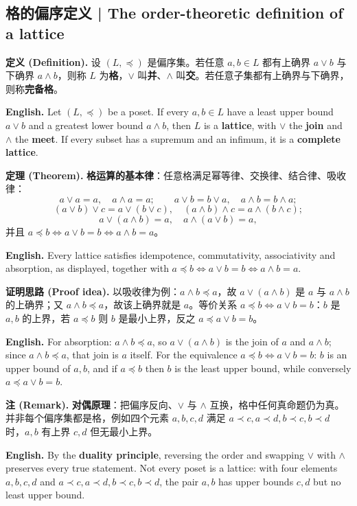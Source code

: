 \documentclass[UTF8,11pt,a4paper]{ctexart}
\newcommand{\EN}[1]{\par\noindent \textbf{English.} #1\par}
\newcommand{\DEF}[2]{\par\noindent\textbf{定义 (Definition).} #1\par\EN{#2}}
\newcommand{\THM}[2]{\par\noindent\textbf{定理 (Theorem).} #1\par\EN{#2}}
\newcommand{\PRF}[2]{\par\noindent\textbf{证明思路 (Proof idea).} #1\par\EN{#2}}
\newcommand{\REM}[2]{\par\noindent\textbf{注 (Remark).} #1\par\EN{#2}}
\begin{document}
\subsection{格的偏序定义 | The order-theoretic definition of a lattice}
\DEF{设 $(L,\preccurlyeq)$ 是偏序集。若任意 $a,b\in L$ 都有上确界 $a\vee b$ 与下确界 $a\wedge b$，则称 $L$ 为\textbf{格}，$\vee$ 叫\textbf{并}、$\wedge$ 叫\textbf{交}。若任意子集都有上确界与下确界，则称\textbf{完备格}。}{Let $(L,\preccurlyeq)$ be a poset. If every $a,b\in L$ have a least upper bound $a\vee b$ and a greatest lower bound $a\wedge b$, then $L$ is a \textbf{lattice}, with $\vee$ the \textbf{join} and $\wedge$ the \textbf{meet}. If every subset has a supremum and an infimum, it is a \textbf{complete lattice}.}
\THM{\textbf{格运算的基本律}：任意格满足幂等律、交换律、结合律、吸收律：
\[
a\vee a=a,\quad a\wedge a=a;\qquad a\vee b=b\vee a,\quad a\wedge b=b\wedge a;
\]
\[
(a\vee b)\vee c=a\vee(b\vee c),\quad (a\wedge b)\wedge c=a\wedge(b\wedge c);
\]
\[
a\vee(a\wedge b)=a,\quad a\wedge(a\vee b)=a,
\]
并且 $a\preccurlyeq b\Leftrightarrow a\vee b=b\Leftrightarrow a\wedge b=a$。}{Every lattice satisfies idempotence, commutativity, associativity and absorption, as displayed, together with $a\preccurlyeq b\Leftrightarrow a\vee b=b\Leftrightarrow a\wedge b=a$.}
\PRF{以吸收律为例：$a\wedge b\preccurlyeq a$，故 $a\vee(a\wedge b)$ 是 $a$ 与 $a\wedge b$ 的上确界；又 $a\wedge b\preccurlyeq a$，故该上确界就是 $a$。等价关系 $a\preccurlyeq b\Leftrightarrow a\vee b=b$：$b$ 是 $a,b$ 的上界，若 $a\preccurlyeq b$ 则 $b$ 是最小上界，反之 $a\preccurlyeq a\vee b=b$。}{For absorption: $a\wedge b\preccurlyeq a$, so $a\vee(a\wedge b)$ is the join of $a$ and $a\wedge b$; since $a\wedge b\preccurlyeq a$, that join is $a$ itself. For the equivalence $a\preccurlyeq b\Leftrightarrow a\vee b=b$: $b$ is an upper bound of $a,b$, and if $a\preccurlyeq b$ then $b$ is the least upper bound, while conversely $a\preccurlyeq a\vee b=b$.}
\REM{\textbf{对偶原理}：把偏序反向、$\vee$ 与 $\wedge$ 互换，格中任何真命题仍为真。并非每个偏序集都是格，例如四个元素 $a,b,c,d$ 满足 $a\prec c,a\prec d,b\prec c,b\prec d$ 时，$a,b$ 有上界 $c,d$ 但无最小上界。}{By the \textbf{duality principle}, reversing the order and swapping $\vee$ with $\wedge$ preserves every true statement. Not every poset is a lattice: with four elements $a,b,c,d$ and $a\prec c,a\prec d,b\prec c,b\prec d$, the pair $a,b$ has upper bounds $c,d$ but no least upper bound.}
\end{document}
